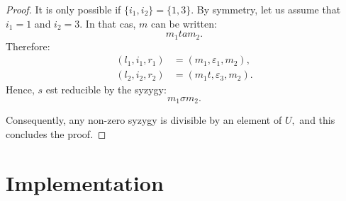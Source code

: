 \documentclass[sigconf]{acmart}
\theoremstyle{plain}
\theoremstyle{definition}
\theoremstyle{remark}
\begin{document}
\begin{proof}
	It is only possible if $\{i_1, i_2\} = \{1, 3\}$.
	By symmetry, let us
	assume that $i_1 = 1$ and $i_2 = 3$. In that cas,
	 $m$ can be written:
	$$m_1 ta m_2.$$
	Therefore:
	\begin{align*}
		(l_1, i_1, r_1) &= (m_1, \varepsilon_1, m_2), \\
		(l_2, i_2, r_2) &= (m_1 t, \varepsilon_3, m_2).
	\end{align*}
	Hence, $s$ est reducible by the syzygy:
	$$m_1 \sigma m_2.$$
	
	Consequently, any non-zero syzygy is divisible
	by an element of $U,$
	and this concludes the proof.
\end{proof}


\section{Implementation}
\end{document}
